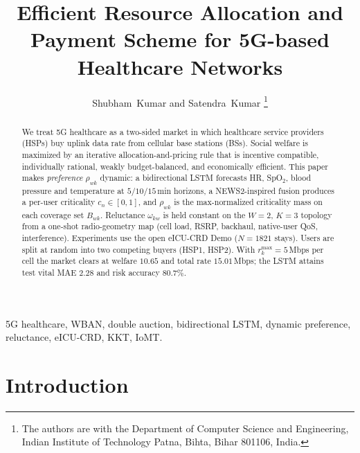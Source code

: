 \documentclass[journal,a4paper,10pt]{IEEEtran}
\begin{document}
\title{Efficient Resource Allocation and Payment Scheme for 5G-based Healthcare Networks}

\author{Shubham~Kumar and Satendra~Kumar%
\thanks{The authors are with the Department of Computer Science and Engineering, Indian Institute of Technology Patna, Bihta, Bihar 801106, India.}}

\maketitle

\begin{abstract}
We treat 5G healthcare as a two-sided market in which healthcare service providers (HSPs) buy uplink data rate from cellular base stations (BSs). Social welfare is maximized by an iterative allocation-and-pricing rule that is incentive compatible, individually rational, weakly budget-balanced, and economically efficient. This paper makes \emph{preference} \(\rho_{wk}\) dynamic: a bidirectional LSTM forecasts HR, SpO\(_2\), blood pressure and temperature at \(5/10/15\)\,min horizons, a NEWS2-inspired fusion produces a per-user criticality \(c_n\in[0,1]\), and \(\rho_{wk}\) is the max-normalized criticality mass on each coverage set \(B_{wk}\). Reluctance \(\omega_{kw}\) is held constant on the \(W=2\), \(K=3\) topology from a one-shot radio-geometry map (cell load, RSRP, backhaul, native-user QoS, interference). Experiments use the open eICU-CRD Demo (\(N=1821\) stays). Users are split at random into two competing buyers (HSP1, HSP2). With \(r_k^{\max}=5\)\,Mbps per cell the market clears at welfare \(10.65\) and total rate \(15.01\)\,Mbps; the LSTM attains test vital MAE \(2.28\) and risk accuracy \(80.7\%\).
\end{abstract}

\begin{IEEEkeywords}
5G healthcare, WBAN, double auction, bidirectional LSTM, dynamic preference, reluctance, eICU-CRD, KKT, IoMT.
\end{IEEEkeywords}

\section{Introduction}
\label{sec:intro}
\end{document}

